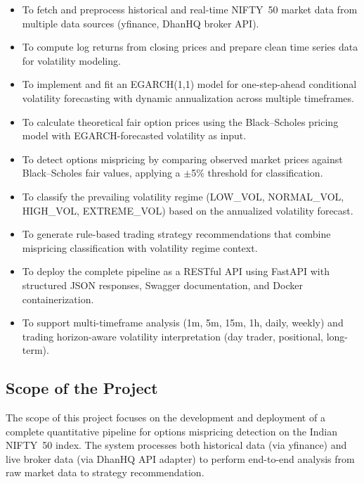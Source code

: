 \documentclass[12pt,a4paper]{article}
\begin{document}
\begin{itemize}
    \item To fetch and preprocess historical and real-time NIFTY~50 market data from multiple data sources (yfinance, DhanHQ broker API).

    \item To compute log returns from closing prices and prepare clean time series data for volatility modeling.

    \item To implement and fit an EGARCH(1,1) model for one-step-ahead conditional volatility forecasting with dynamic annualization across multiple timeframes.

    \item To calculate theoretical fair option prices using the Black--Scholes pricing model with EGARCH-forecasted volatility as input.

    \item To detect options mispricing by comparing observed market prices against Black--Scholes fair values, applying a $\pm$5\% threshold for classification.

    \item To classify the prevailing volatility regime (LOW\_VOL, NORMAL\_VOL, HIGH\_VOL, EXTREME\_VOL) based on the annualized volatility forecast.

    \item To generate rule-based trading strategy recommendations that combine mispricing classification with volatility regime context.

    \item To deploy the complete pipeline as a RESTful API using FastAPI with structured JSON responses, Swagger documentation, and Docker containerization.

    \item To support multi-timeframe analysis (1m, 5m, 15m, 1h, daily, weekly) and trading horizon-aware volatility interpretation (day trader, positional, long-term).
\end{itemize}

\subsection{Scope of the Project}

The scope of this project focuses on the development and deployment of a complete quantitative pipeline for options mispricing detection on the Indian NIFTY~50 index. The system processes both historical data (via yfinance) and live broker data (via DhanHQ API adapter) to perform end-to-end analysis from raw market data to strategy recommendation.
\end{document}
